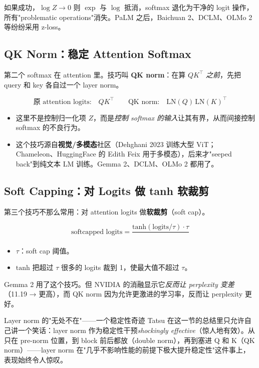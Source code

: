 \documentclass[a4paper]{article}
\begin{document}
如果成功，$\log Z \to 0$ 则 $\exp$ 与 $\log$ 抵消，softmax 退化为干净的 logit 操作，所有"problematic operations"消失。PaLM 之后，Baichuan 2、DCLM、OLMo 2 等纷纷采用 z-loss。

\subsection{QK Norm：稳定 Attention Softmax}

第二个 softmax 在 attention 里。技巧叫 \textbf{QK norm}：在算 $Q K^\top$ \emph{之前}，先把 query 和 key 各自过一个 layer norm。

\[
\text{原 attention logits:} \quad Q K^\top
\qquad
\text{QK norm:} \quad \mathrm{LN}(Q)\,\mathrm{LN}(K)^\top
\]

\begin{itemize}
    \item 这里不是控制归一化项 $Z$，而是\emph{控制 softmax 的输入}让其有界，从而间接控制 softmax 的不良行为。
    \item 这个技巧源自\textbf{视觉/多模态}社区（Dehghani 2023 训练大型 ViT；Chameleon、HuggingFace 的 Edith Feix 用于多模态），后来才"seeped back"到纯文本 LM 训练。Gemma 2、DCLM、OLMo 2 都用了。
\end{itemize}

\subsection{Soft Capping：对 Logits 做 tanh 软裁剪}

第三个技巧不那么常用：对 attention logits 做\textbf{软裁剪}（soft cap）。

\[
\text{softcapped logits} = \frac{\mathrm{tanh}(\text{logits} / \tau) \cdot \tau}{}
\]

\begin{itemize}
    \item $\tau$：soft cap 阈值。
    \item $\mathrm{tanh}$ 把超过 $\tau$ 很多的 logits 裁到 1，使最大值不超过 $\tau$。
\end{itemize}

Gemma 2 用了这个技巧。但 NVIDIA 的消融显示它\emph{反而让 perplexity 变差}（11.19 → 更高），而 QK norm 因为允许更激进的学习率，反而让 perplexity 更好。

\begin{knowledgebox}{Layer norm 的"无处不在"——一个稳定性奇迹}
Tatsu 在这一节的总结里只允许自己讲一个笑话：layer norm 作为稳定性干预\emph{shockingly effective}（惊人地有效）。从只在 pre-norm 位置，到 block 前后都放（double norm），再到塞进 Q 和 K（QK norm）——layer norm 在"几乎不影响性能的前提下极大提升稳定性"这件事上，表现始终令人惊叹。
\end{knowledgebox}
\end{document}
